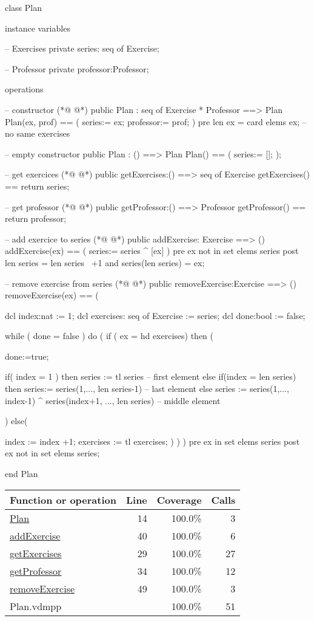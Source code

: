 \begin{vdmpp}[breaklines=true]
class Plan

instance variables
 
 -- Exercises
 private series: seq of Exercise;
 
 -- Professor
 private professor:Professor;
 
operations
 
 -- constructor
(*@
\label{Plan:14}
@*)
 public Plan : seq of Exercise * Professor ==> Plan
 Plan(ex, prof) == (
  series:= ex;
  professor:= prof;
 )
 pre len ex = card elems ex; --no same exercises
 
 
 -- empty constructor
 public Plan : () ==> Plan
 Plan() == (
  series:= [];
 );
 
 -- get exercices
(*@
\label{getExercises:29}
@*)
 public getExercises:() ==> seq of Exercise
 getExercises()  ==
  return series;
  
 -- get professor
(*@
\label{getProfessor:34}
@*)
 public getProfessor:() ==> Professor
 getProfessor()  ==
  return professor;
  
  
 -- add exercice to series
(*@
\label{addExercise:40}
@*)
 public addExercise: Exercise ==> ()
 addExercise(ex) == (
   series:= series ^ [ex]
 )
 pre ex not in set elems series
 post len series = len series~ +1 and series(len series) = ex;
 
 
 -- remove exercise from series
(*@
\label{removeExercise:49}
@*)
 public removeExercise:Exercise ==> ()
 removeExercise(ex) == (
 
   dcl index:nat := 1;
   dcl exercises: seq of Exercise := series;
   dcl done:bool := false;
   
   while ( done = false ) do (
    if ( ex = hd exercises) then (
    
    done:=true;
    
    if( index = 1 ) then  series := tl series                 -- first element
    else if(index = len series) then series:= series(1,..., len series-1)   -- last element
    else series := series(1,..., index-1) ^ series(index+1, ..., len series)  -- middle element
    
   )  else(
   
    index := index +1;
    exercises := tl exercises;
   )
   )
 )
 pre ex in set elems series
 post ex not in set elems series;
 
end Plan
\end{vdmpp}
\bigskip
\begin{longtable}{|l|r|r|r|}
\hline
Function or operation & Line & Coverage & Calls \\
\hline
\hline
\hyperref[Plan:14]{Plan} & 14&100.0\% & 3 \\
\hline
\hyperref[addExercise:40]{addExercise} & 40&100.0\% & 6 \\
\hline
\hyperref[getExercises:29]{getExercises} & 29&100.0\% & 27 \\
\hline
\hyperref[getProfessor:34]{getProfessor} & 34&100.0\% & 12 \\
\hline
\hyperref[removeExercise:49]{removeExercise} & 49&100.0\% & 3 \\
\hline
\hline
Plan.vdmpp & & 100.0\% & 51 \\
\hline
\end{longtable}

